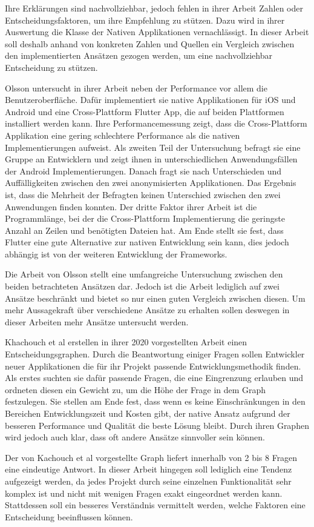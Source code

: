 Ihre Erklärungen sind nachvollziehbar, jedoch fehlen in ihrer Arbeit Zahlen oder Entscheidungsfaktoren, um ihre Empfehlung zu stützen. Dazu wird in ihrer Auswertung die Klasse der Nativen Applikationen vernachlässigt. In dieser Arbeit soll deshalb anhand von konkreten Zahlen und Quellen ein Vergleich zwischen den implementierten Ansätzen gezogen werden, um eine nachvollziehbar Entscheidung zu stützen.

Olsson \cite{Olsson_2020} untersucht in ihrer Arbeit neben der Performance vor allem die Benutzeroberfläche. Dafür implementiert sie native Applikationen für iOS und Android und eine Cross-Plattform Flutter App, die auf beiden Plattformen installiert werden kann. Ihre Performancemessung zeigt, dass die Cross-Plattform Applikation eine gering schlechtere Performance als die nativen Implementierungen aufweist. Als zweiten Teil der Untersuchung befragt sie eine Gruppe an Entwicklern und zeigt ihnen in unterschiedlichen Anwendungsfällen der Android Implementierungen. Danach fragt sie nach Unterschieden und Auffälligkeiten zwischen den zwei anonymisierten Applikationen. Das Ergebnis ist, dass die Mehrheit der Befragten keinen Unterschied zwischen den zwei Anwendungen finden konnten. Der dritte Faktor ihrer Arbeit ist die Programmlänge, bei der die Cross-Plattform Implementierung die geringste Anzahl an Zeilen und benötigten Dateien hat. Am Ende stellt sie fest, dass Flutter eine gute Alternative zur nativen Entwicklung sein kann, dies jedoch abhängig ist von der weiteren Entwicklung der Frameworks.

Die Arbeit von Olsson \cite{Olsson_2020} stellt eine umfangreiche Untersuchung zwischen den beiden betrachteten Ansätzen dar. Jedoch ist die Arbeit lediglich auf zwei Ansätze beschränkt und bietet so nur einen guten Vergleich zwischen diesen. Um mehr Aussagekraft über verschiedene Ansätze zu erhalten sollen deswegen in dieser Arbeiten mehr Ansätze untersucht werden. 

Khachouch et al \cite{IEEE_Khackouch_Al} erstellen in ihrer 2020 vorgestellten Arbeit einen Entscheidungsgraphen. Durch die Beantwortung einiger Fragen sollen Entwickler neuer Applikationen die für ihr Projekt passende Entwicklungsmethodik finden. Als erstes suchten sie dafür passende Fragen, die eine Eingrenzung erlauben und ordneten diesen ein Gewicht zu, um die Höhe der Frage in dem Graph festzulegen. Sie stellen am Ende fest, dass wenn es keine Einschränkungen in den Bereichen Entwicklungszeit und Kosten gibt, der native Ansatz aufgrund der besseren Performance und Qualität die beste Lösung bleibt. Durch ihren Graphen wird jedoch auch klar, dass oft andere Ansätze sinnvoller sein können.

Der von Kachouch et al \cite{IEEE_Khackouch_Al} vorgestellte Graph liefert innerhalb von 2 bis 8 Fragen eine eindeutige Antwort. In dieser Arbeit hingegen soll lediglich eine Tendenz aufgezeigt werden, da jedes Projekt durch seine einzelnen Funktionalität sehr komplex ist und nicht mit wenigen Fragen exakt eingeordnet werden kann. Stattdessen soll ein besseres Verständnis vermittelt werden, welche Faktoren eine Entscheidung beeinflussen können. 